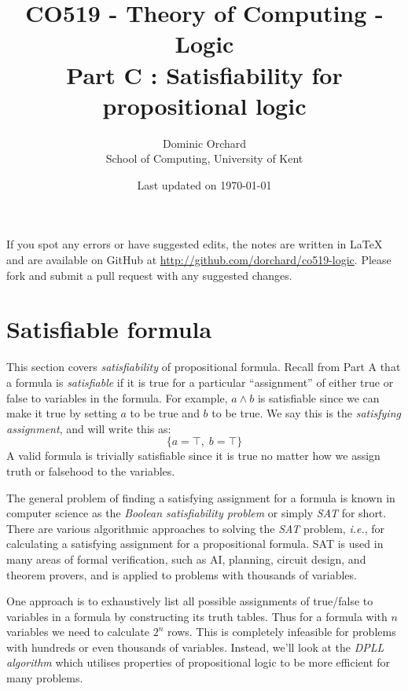 \documentclass{article}
\title{\vspace{-3em}CO519 - Theory of Computing - Logic \\
  {\large{Part C : Satisfiability for propositional logic}}}
\author{Dominic Orchard \\
  {\small{School of Computing, University of Kent}}}
\date{Last updated on \today}
\theoremstyle{definition}
\newcommand{\ie}{\emph{i.e.}}
\begin{document}
\maketitle

\noindent
If you spot any errors or have suggested edits, the notes are written
in LaTeX and are available on GitHub at
\url{http://github.com/dorchard/co519-logic}. Please fork and submit a
pull request with any suggested changes.

\section{Satisfiable formula}

This section covers \emph{satisfiability} of propositional
formula. Recall from Part A that a formula is \emph{satisfiable} if it
is true for a particular ``assignment'' of either true or false to
variables in the formula. For example, $a \wedge b$ is satisfiable
since we can make it true by setting $a$ to be true and $b$ to be
true. We say this is the \emph{satisfying assignment}, and will write
this as:
%
\begin{equation*}
\{a = \top, \; b = \top\}
\end{equation*}
%
A valid formula is trivially satisfiable since it is true no matter
how we assign truth or falsehood to the variables.

The general problem of finding a satisfying assignment for a formula
is known in computer science as the \emph{Boolean satisfiability
  problem} or simply \emph{SAT} for short. There are various
algorithmic approaches to solving the \emph{SAT} problem, \ie{}, for
calculating a satisfying assignment for a propositional formula.  SAT
is used in many areas of formal verification, such as AI, planning,
circuit design, and theorem provers, and is applied to problems with
thousands of variables.

One approach is to exhaustively list all possible assignments of
true/false to variables in a formula by constructing its truth
tables. Thus for a formula with $n$ variables we need to calculate
$2^n$ rows. This is completely infeasible for problems with hundreds
or even thousands of variables. Instead, we'll look at the \emph{DPLL
  algorithm} which utilises properties of propositional
logic to be more efficient for many problems.
\end{document}
